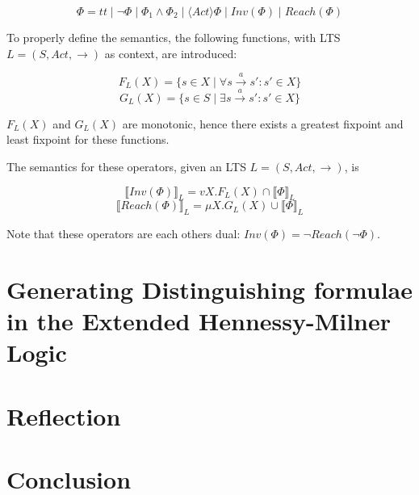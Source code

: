 \documentclass[runningheads]{llncs}
\begin{document}
$$\Phi = tt \mid \neg \Phi \mid \Phi_1 \land \Phi_2 \mid \langle Act\rangle \Phi \mid Inv(\Phi) \mid Reach(\Phi) $$

To properly define the semantics, the following functions, with LTS $L = (S, Act, \rightarrow)$ as context, are introduced:

$$F_L(X) = \{s \in X \mid \forall s \xrightarrow{a} s' : s' \in X \}$$
$$G_L(X) = \{s \in S \mid \exists s \xrightarrow{a} s' : s' \in X \}$$

$F_L(X)$ and $G_L(X)$ are monotonic, hence there exists a greatest fixpoint and least fixpoint for these functions.

The semantics for these operators, given an LTS $L = (S, Act, \rightarrow)$, is

$$\llbracket Inv(\Phi) \rrbracket_L = vX.F_L(X) \cap \llbracket \Phi \rrbracket_L $$
$$\llbracket Reach(\Phi) \rrbracket_L = \mu X.G_L(X) \cup \llbracket \Phi \rrbracket_L$$

{\color{blue}
    Note that these operators are each others dual: $Inv(\Phi) = \neg Reach(\neg \Phi)$.}



\section{Generating Distinguishing formulae in the Extended Hennessy-Milner Logic}

\section{Reflection}
\section{Conclusion}
\end{document}
